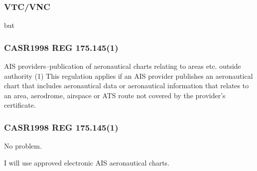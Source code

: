 \begin{frame}
\frametitle{VTC/VNC}
\large
\begin{center}
but
\end{center}
\end{frame}

\begin{frame}
\frametitle{CASR1998 REG 175.145(1)}
\begin{block}{AIS providers--publication of aeronautical charts relating to areas etc. outside authority}
(1) This regulation applies if an AIS provider publishes an aeronautical chart that includes aeronautical data or aeronautical information that relates to an area, aerodrome, airspace or ATS route not covered by the provider's certificate.
\end{block}
\end{frame}

\begin{frame}
\frametitle{CASR1998 REG 175.145(1)}
\large
\begin{center}
No problem.
\par
I will use approved electronic AIS aeronautical charts.
\end{center}
\end{frame}

